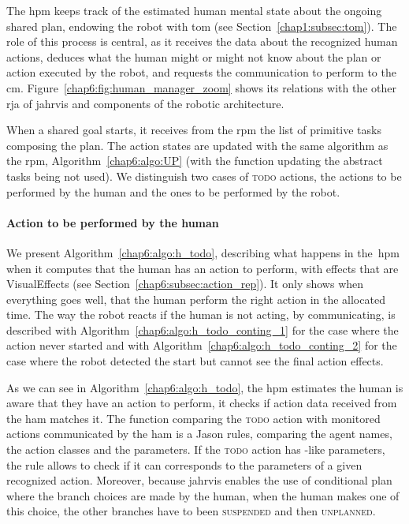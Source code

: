 \documentclass[a4paper,11pt,twoside]{StyleThese}
\begin{document}
The \acrfull{hpm} keeps track of the estimated human mental state about the ongoing shared plan, endowing the robot with \acrlong{tom} (see Section~\ref{chap1:subsec:tom}). The role of this process is central, as it receives the data about the recognized human actions, deduces what the human might or might not know about the plan or action executed by the robot, and requests the communication to perform to the \acrfull{cm}. Figure~\ref{chap6:fig:human_manager_zoom} shows its relations with the other \acrshort{rja} of \acrshort{jahrvis} and components of the robotic architecture.

When a shared goal starts, it receives from the \acrshort{rpm} the list of primitive tasks composing the plan. The action states are updated with the same algorithm as the \acrshort{rpm}, Algorithm~\ref{chap6:algo:UP} (with the function updating the abstract tasks being not used). We distinguish two cases of \textsc{todo} actions, the actions to be performed by the human and the ones to be performed by the robot.

\paragraph{Action to be performed by the human} We present Algorithm~\ref{chap6:algo:h_todo}, describing what happens in the~\acrshort{hpm} when it computes that the human has an action to perform, with effects that are VisualEffects (see Section~\ref{chap6:subsec:action_rep}). It only shows when everything goes well, \ie that the human perform the right action in the allocated time. The way the robot reacts if the human is not acting, by communicating, is described with Algorithm~\ref{chap6:algo:h_todo_conting_1} for the case where the action never started and with Algorithm~\ref{chap6:algo:h_todo_conting_2} for the case where the robot detected the start but cannot see the final action effects.

As we can see in Algorithm~\ref{chap6:algo:h_todo}, the \acrshort{hpm} estimates the human is aware that they have an action to perform, it checks if action data received from the \acrlong{ham} matches it. The function comparing the \textsc{todo} action with monitored actions communicated by the \acrshort{ham} is a Jason rules, comparing the agent names, the action classes and the parameters. If the \textsc{todo} action has \sparql-like parameters, the rule allows to check if it can corresponds to the parameters of a given recognized action. Moreover, because \acrshort{jahrvis} enables the use of conditional plan where the branch choices are made by the human, when the human makes one of this choice, the other branches have to been \textsc{suspended} and then \textsc{unplanned}.
\end{document}
